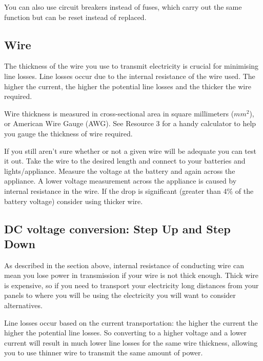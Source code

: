 \documentclass{article}
\theoremstyle{definition}
\theoremstyle{definition}
\theoremstyle{remark}
\begin{document}
      You can also use circuit breakers instead of fuses, which carry out the same function but can be reset instead of replaced.
    


  {\color{blue}\subsection{Wire}} %
  \label{sub:wire}

    The thickness of the wire you use to transmit electricity is crucial for minimising line losses. Line losses occur due to the internal resistance of the wire used. The higher the current, the higher the potential line losses and the thicker the wire required. 

    Wire thickness is measured in cross-sectional area in square millimeters ($mm^{2}$), or American Wire Gauge (AWG). See Resource 3 for a handy calculator to help you gauge the thickness of wire required. 

    If you still aren't sure whether or not a given wire will be adequate you can test it out. Take the wire to the desired length and connect to your batteries and lights/appliance. Measure the voltage at the battery and again across the appliance. A lower voltage measurement across the appliance is caused by internal resistance in the wire. If the drop is significant (greater than 4\% of the battery voltage) consider using thicker wire. 
  

  {\color{blue}\subsection{DC voltage conversion: Step Up and Step Down}} %
  \label{sub:dc_voltage_conversion_step_up_and_step_down}

    As described in the section above, internal resistance of conducting wire can mean you lose power in transmission if your wire is not thick enough. Thick wire is expensive, so if you need to transport your electricity long distances from your panels to where you will be using the electricity you will want to consider alternatives.

    Line losses occur based on the current transportation: the higher the current the higher the potential line losses. So converting to a higher voltage and a lower current will result in much lower line losses for the same wire thickness, allowing you to use thinner wire to transmit the same amount of power. 
\end{document}

